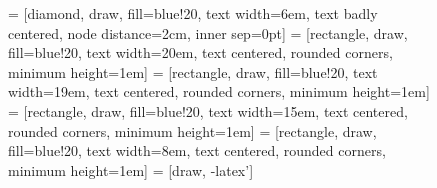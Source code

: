 \documentclass[5p,times]{elsarticle}
\begin{document}
\begin{figure}[]
\centering
{} = [diamond, draw, fill=blue!20, text width=6em, text badly centered, node distance=2cm, inner sep=0pt]
 = [rectangle, draw, fill=blue!20, text width=20em, text centered, rounded corners, minimum height=1em]
 = [rectangle, draw, fill=blue!20, text width=19em, text centered, rounded corners, minimum height=1em]
 = [rectangle, draw, fill=blue!20, text width=15em, text centered, rounded corners, minimum height=1em]
 = [rectangle, draw, fill=blue!20, text width=8em, text centered, rounded corners, minimum height=1em]
 = [draw, -latex']

\end{figure}
\end{document}
